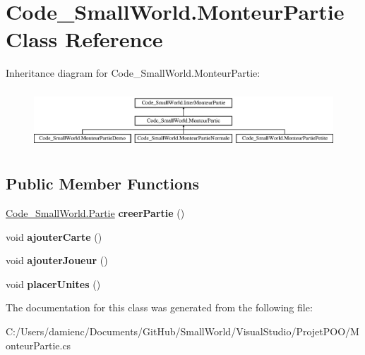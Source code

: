\hypertarget{class_code___small_world_1_1_monteur_partie}{\section{Code\-\_\-\-Small\-World.\-Monteur\-Partie Class Reference}
\label{class_code___small_world_1_1_monteur_partie}
}
Inheritance diagram for Code\-\_\-\-Small\-World.\-Monteur\-Partie\-:\begin{figure}[H]
\begin{center}
\leavevmode
\includegraphics[height=2.231076cm]{class_code___small_world_1_1_monteur_partie}
\end{center}
\end{figure}
\subsection*{Public Member Functions}
\begin{DoxyCompactItemize}
\item 
\hypertarget{class_code___small_world_1_1_monteur_partie_a3ed8eb95a46eb27321ebc89a61c92920}{\hyperlink{interface_code___small_world_1_1_partie}{Code\-\_\-\-Small\-World.\-Partie} {\bfseries creer\-Partie} ()}\label{class_code___small_world_1_1_monteur_partie_a3ed8eb95a46eb27321ebc89a61c92920}

\item 
\hypertarget{class_code___small_world_1_1_monteur_partie_a2fd91bc4e3753c27c41d03e0d46a7882}{void {\bfseries ajouter\-Carte} ()}\label{class_code___small_world_1_1_monteur_partie_a2fd91bc4e3753c27c41d03e0d46a7882}

\item 
\hypertarget{class_code___small_world_1_1_monteur_partie_a4370c4d48c0e2d97611d3d449710fb1b}{void {\bfseries ajouter\-Joueur} ()}\label{class_code___small_world_1_1_monteur_partie_a4370c4d48c0e2d97611d3d449710fb1b}

\item 
\hypertarget{class_code___small_world_1_1_monteur_partie_a3bedbbf4bae673e8d817cc4fab26dde3}{void {\bfseries placer\-Unites} ()}\label{class_code___small_world_1_1_monteur_partie_a3bedbbf4bae673e8d817cc4fab26dde3}

\end{DoxyCompactItemize}


The documentation for this class was generated from the following file\-:\begin{DoxyCompactItemize}
\item 
C\-:/\-Users/damienc/\-Documents/\-Git\-Hub/\-Small\-World/\-Visual\-Studio/\-Projet\-P\-O\-O/Monteur\-Partie.\-cs\end{DoxyCompactItemize}
